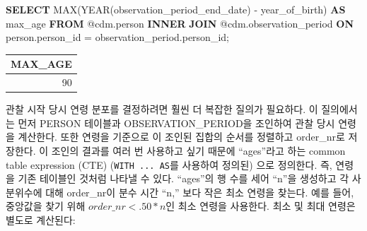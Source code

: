 \documentclass[11pt]{book}
\newenvironment{Shaded}{\begin{snugshade}}{\end{snugshade}}
\newcommand{\KeywordTok}[1]{\textcolor[rgb]{0.13,0.29,0.53}{\textbf{#1}}}
\newcommand{\DataTypeTok}[1]{\textcolor[rgb]{0.13,0.29,0.53}{#1}}
\newcommand{\FunctionTok}[1]{\textcolor[rgb]{0.00,0.00,0.00}{#1}}
\newcommand{\NormalTok}[1]{#1}
\theoremstyle{definition}
\theoremstyle{definition}
\theoremstyle{definition}
\theoremstyle{remark}
\begin{document}
\begin{Shaded}
\begin{Highlighting}[]
\KeywordTok{SELECT} \FunctionTok{MAX}\NormalTok{(}\DataTypeTok{YEAR}\NormalTok{(observation_period_end_date) -}
\NormalTok{           year_of_birth) }\KeywordTok{AS}\NormalTok{ max_age}
\KeywordTok{FROM}\NormalTok{ @cdm.person}
\KeywordTok{INNER} \KeywordTok{JOIN}\NormalTok{ @cdm.observation_period}
  \KeywordTok{ON}\NormalTok{ person.person_id = observation_period.person_id;}
\end{Highlighting}
\end{Shaded}

\begin{longtable}[]{@{}r@{}}
\toprule
MAX\_AGE\tabularnewline
\midrule
\endhead
90\tabularnewline
\bottomrule
\end{longtable}

관찰 시작 당시 연령 분포를 결정하려면 훨씬 더 복잡한 질의가 필요하다. 이
질의에서는 먼저 PERSON 테이블과 OBSERVATION\_PERIOD을 조인하여 관찰 당시
연령을 계산한다. 또한 연령을 기준으로 이 조인된 집합의 순서를 정렬하고
order\_nr로 저장한다. 이 조인의 결과를 여러 번 사용하고 싶기 때문에
``ages''라고 하는 common table expression (CTE)
(\texttt{WITH\ ...\ AS}를 사용하여 정의된) 으로 정의한다. 즉, 연령을
기존 테이블인 것처럼 나타낼 수 있다. ``ages''의 행 수를 세어 ``n''을
생성하고 각 사분위수에 대해 order\_nr이 분수 시간 ``n,'' 보다 작은 최소
연령을 찾는다. 예를 들어, 중앙값을 찾기 위해 \(order\_nr < .50 * n\)인
최소 연령을 사용한다. 최소 및 최대 연령은 별도로 계산된다:
\end{document}

